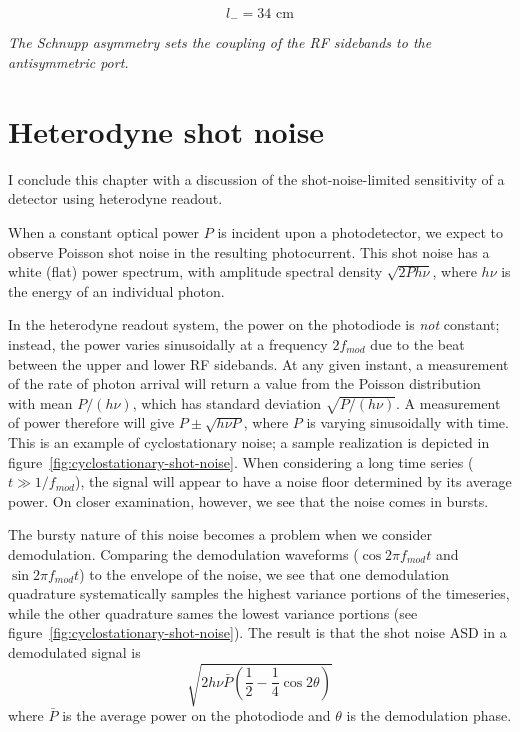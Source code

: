 \begin{equation}
l_{-}=34\text{\ cm}
\end{equation}

\emph{The Schnupp asymmetry sets the coupling of the RF sidebands to the
antisymmetric port.}

\section{Heterodyne shot noise}

I conclude this chapter with a discussion of the shot-noise-limited
sensitivity of a detector using heterodyne readout.

When a constant optical power $P$ is incident upon a photodetector, we
expect to observe Poisson shot noise in the resulting photocurrent.
This shot noise has a white (flat) power spectrum, with amplitude
spectral density $\sqrt{2 P h \nu}$, where $h\nu$ is the energy of an
individual photon.

In the heterodyne readout system, the power on the photodiode is
\emph{not} constant; instead, the power varies sinusoidally at a
frequency $2f_{mod}$ due to the beat between the upper and lower RF
sidebands.  At any given instant, a measurement of the rate of photon
arrival will return a value from the Poisson distribution with mean
$P/(h\nu)$, which has standard deviation $\sqrt{P/(h\nu)}$.  A
measurement of power therefore will give $P\pm\sqrt{h\nu P}$, where
$P$ is varying sinusoidally with time.  This is an example of
cyclostationary noise; a sample realization is depicted in
figure~\ref{fig:cyclostationary-shot-noise}.  When considering a long
time series ($t\gg1/f_{mod}$), the signal will appear to have a noise
floor determined by its average power.  On closer examination,
however, we see that the noise comes in bursts.

The bursty nature of this noise becomes a problem when we consider
demodulation.  Comparing the demodulation waveforms ($\cos 2\pi
f_{mod} t$ and $\sin 2\pi f_{mod} t$) to the envelope of the noise, we
see that one demodulation quadrature systematically samples the
highest variance portions of the timeseries, while the other
quadrature sames the lowest variance portions (see
figure~\ref{fig:cyclostationary-shot-noise}).  The
result\cite{Niebauer1991Nonstationary} is that the shot noise ASD in a
demodulated signal is
\begin{equation}
\sqrt{2h\nu\bar{P} \left( \frac{1}{2}-\frac{1}{4}\cos2\theta\right)}
\end{equation}
where $\bar{P}$ is the average power on the photodiode and $\theta$ is
the demodulation phase.

